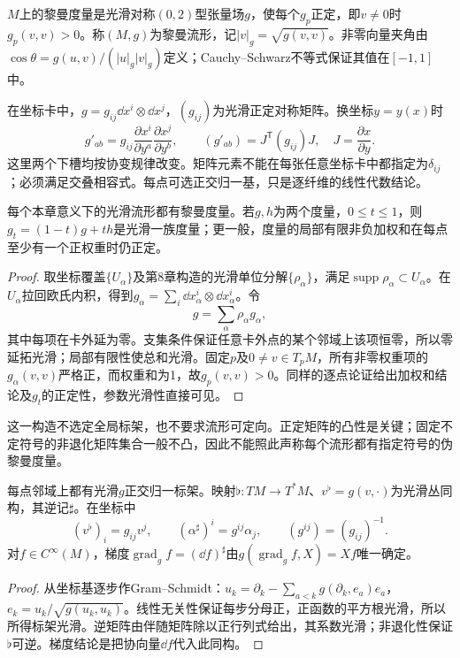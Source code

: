 \begin{definition}[黎曼度量]\label{def:riemannian-metric}
$M$上的黎曼度量是光滑对称$(0,2)$型张量场$g$，使每个$g_p$正定，即$v\ne0$时$g_p(v,v)>0$。称$(M,g)$为黎曼流形，记$|v|_g=\sqrt{g(v,v)}$。非零向量夹角由$\cos\theta=g(u,v)/(|u|_g|v|_g)$定义；Cauchy--Schwarz不等式保证其值在$[-1,1]$中。
\end{definition}

在坐标卡中，$g=g_{ij}\dd x^i\otimes\dd x^j$，$(g_{ij})$为光滑正定对称矩阵。换坐标$y=y(x)$时
\[
 g'_{ab}=g_{ij}\frac{\partial x^i}{\partial y^a}\frac{\partial x^j}{\partial y^b},
 \qquad (g'_{ab})=J^{\mathsf T}(g_{ij})J,\quad J=\frac{\partial x}{\partial y}.
\]
这里两个下槽均按协变规律改变。矩阵元素不能在每张任意坐标卡中都指定为$\delta_{ij}$；必须满足交叠相容式。每点可选正交归一基，只是逐纤维的线性代数结论。

\begin{theorem}[度量的存在与凸性]\label{thm:metric-existence}
每个本章意义下的光滑流形都有黎曼度量。若$g,h$为两个度量，$0\leq t\leq1$，则$g_t=(1-t)g+th$是光滑一族度量；更一般，度量的局部有限非负加权和在每点至少有一个正权重时仍正定。
\end{theorem}
\begin{proof}
取坐标覆盖$\{U_\alpha\}$及第8章构造的光滑单位分解$\{\rho_\alpha\}$，满足$\operatorname{supp}\rho_\alpha\subset U_\alpha$。在$U_\alpha$拉回欧氏内积，得到$g_\alpha=\sum_i\dd x_\alpha^i\otimes\dd x_\alpha^i$。令
\[
 g=\sum_\alpha\rho_\alpha g_\alpha,
\]
其中每项在卡外延为零。支集条件保证任意卡外点的某个邻域上该项恒零，所以零延拓光滑；局部有限性使总和光滑。固定$p$及$0\ne v\in T_pM$，所有非零权重项的$g_\alpha(v,v)$严格正，而权重和为1，故$g_p(v,v)>0$。同样的逐点论证给出加权和结论及$g_t$的正定性，参数光滑性直接可见。
\end{proof}

这一构造不选定全局标架，也不要求流形可定向。正定矩阵的凸性是关键；固定不定符号的非退化矩阵集合一般不凸，因此不能照此声称每个流形都有指定符号的伪黎曼度量。

\begin{proposition}[局部正交标架与升降指标]\label{prop:orthonormal-musical}
每点邻域上都有光滑$g$正交归一标架。映射$\flat:TM\to T^*M$、$v^\flat=g(v,\cdot)$为光滑丛同构，其逆记$\sharp$。在坐标中
\[
 (v^\flat)_i=g_{ij}v^j,\qquad (\alpha^\sharp)^i=g^{ij}\alpha_j,
 \qquad(g^{ij})=(g_{ij})^{-1}.
\]
对$f\in C^\infty(M)$，梯度$\operatorname{grad}_g f=(\dd f)^\sharp$由$g(\operatorname{grad}_g f,X)=Xf$唯一确定。
\end{proposition}
\begin{proof}
从坐标基逐步作Gram--Schmidt：$u_k=\partial_k-\sum_{a<k}g(\partial_k,e_a)e_a$，$e_k=u_k/\sqrt{g(u_k,u_k)}$。线性无关性保证每步分母正，正函数的平方根光滑，所以所得标架光滑。逆矩阵由伴随矩阵除以正行列式给出，其系数光滑；非退化性保证$\flat$可逆。梯度结论是把协向量$\dd f$代入此同构。
\end{proof}

